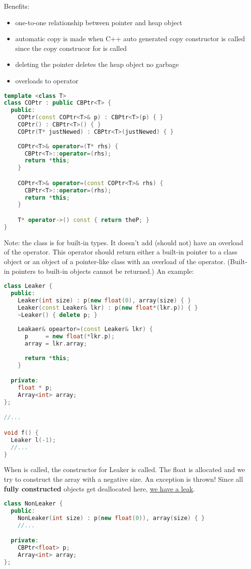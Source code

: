 Benefits:

\begin{itemize}
  \item one-to-one relationship between pointer and heap object
  \item automatic copy is made when C++ auto generated copy constructor is called since the copy construcor for  is called
  \item deleting the pointer deletes the heap object \textrightarrow no garbage
  \item overloads to \cpp{*} operator
\end{itemize}

\begin{lstlisting}[language=C++]
template <class T>
class COPtr : public CBPtr<T> {
  public:
    COPtr(const COPtr<T>& p) : CBPtr<T>(p) { }
    COPtr() : CBPtr<T>() { }
    COPtr(T* justNewed) : CBPtr<T>(justNewed) { }
    
    COPtr<T>& operator=(T* rhs) {
      CBPtr<T>::operator=(rhs);
      return *this;
    }

    COPtr<T>& operator=(const COPtr<T>& rhs) {
      CBPtr<T>::operator=(rhs);
      return *this;
    }

    T* operator->() const { return theP; }
}
\end{lstlisting}

Note: the  class is for built-in types. It doesn't add (should not) have an overload of the \cpp{->} operator. This operator should return either a built-in pointer to a class object or an object of a pointer-like class with an overload of the \cpp{->} operator. (Built-in pointers to built-in objects cannot be returned.) An example:

\begin{lstlisting}[language=C++]
class Leaker {
  public:
    Leaker(int size) : p(new float(0), array(size) { }
    Leaker(const Leaker& lkr) : p(new float*(lkr.p)) { }
    ~Leaker() { delete p; }
    
    Leakaer& opeartor=(const Leaker& lkr) {
      p     = new float(*lkr.p);
      array = lkr.array;
      
      return *this;
    }

  private:
    float * p;
    Array<int> array; 
};

//...

void f() {
  Leaker l(-1);
  //...
}
\end{lstlisting}

When  is called, the constructor for Leaker is called. The float is allocated and we try to construct the array with a negative size. An exception is thrown! Since all \textbf{fully constructed} objects get deallocated here, \underline{we have a leak}.

\begin{lstlisting}[language=C++]
class NonLeaker {
  public:
    NonLeaker(int size) : p(new float(0)), array(size) { }
    //...

  private:
    CBPtr<float> p;
    Array<int> array;
};
\end{lstlisting}